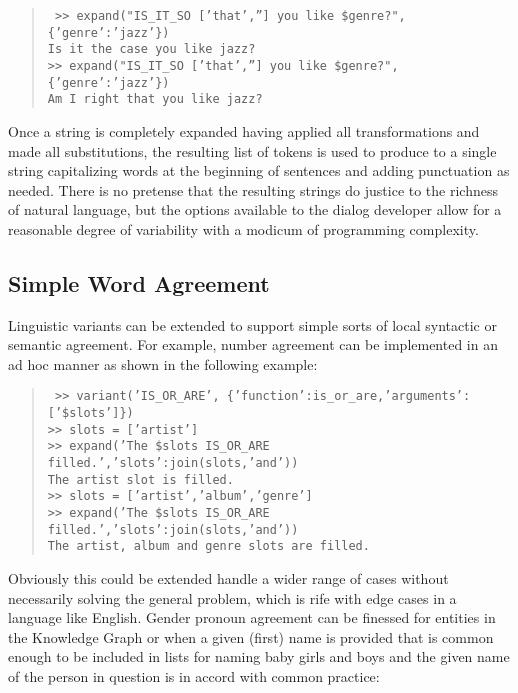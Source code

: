 \documentclass[letterpaper,11pt]{article}
\begin{document}
\begin{quotation} \tt
%
  \noindent
  >> expand("IS\_IT\_SO ['that',''] you like \$genre?", \{'genre':'jazz'\})\\
  Is it the case you like jazz?\\
  >> expand("IS\_IT\_SO ['that',''] you like \$genre?", \{'genre':'jazz'\})\\
  Am I right that you like jazz?\\
%
\end{quotation}
%
Once a string is completely expanded having applied all transformations and made all substitutions, the resulting list of tokens is used to produce to a single string capitalizing words at the beginning of sentences and adding punctuation as needed. 
%
There is no pretense that the resulting strings do justice to the richness of natural language, but the options available to the dialog developer allow for a reasonable degree of variability with a modicum of programming complexity. 

\subsection*{Simple Word Agreement}

Linguistic variants can be extended to support simple sorts of local syntactic or semantic agreement. For example, number agreement can be implemented in an ad hoc manner as shown in the following example:

\begin{quotation} \tt
%
  \noindent
  >> variant('IS\_OR\_ARE', \{'function':is\_or\_are,'arguments':['\$slots']\})\\
  >> slots = ['artist']\\
  >> expand('The \$slots IS\_OR\_ARE filled.',{'slots':join(slots,'and')})\\
  The artist slot is filled.\\
  >> slots = ['artist','album','genre']\\
  >> expand('The \$slots IS\_OR\_ARE filled.',{'slots':join(slots,'and')})\\
  The artist, album and genre slots are filled.\\
%
\end{quotation}
%
Obviously this could be extended handle a wider range of cases without necessarily solving the general problem, which is rife with edge cases in a language like English. Gender pronoun agreement can be finessed for entities in the Knowledge Graph or when a given (first) name is provided that is common enough to be included in lists for naming baby girls and boys and the given name of the person in question is in accord with common practice:
\end{document}
